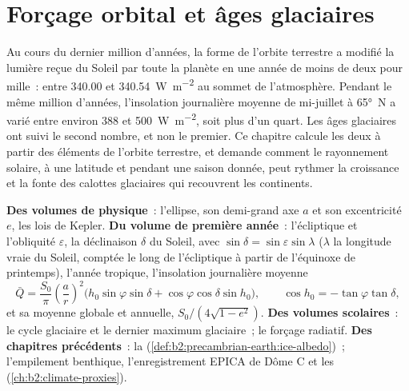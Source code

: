 \chapter{Forçage orbital et âges glaciaires}\label{ch:b2:orbital-forcing}

Au cours du dernier million d'années, la forme de l'orbite terrestre a modifié
la lumière reçue du Soleil par toute la planète en une année de moins de deux pour mille~:
entre \num{340.00} et \qty{340.54}{W.m^{-2}} au sommet de l'atmosphère. Pendant le même
million d'années, l'insolation journalière moyenne de mi-juillet à \ang{65}~N a varié entre
environ 388 et \qty{500}{W.m^{-2}}, soit plus d'un quart. Les âges glaciaires ont suivi le second
nombre, et non le premier. Ce chapitre calcule les deux à partir des éléments de l'orbite
terrestre, et demande comment le rayonnement solaire, à une latitude et pendant une saison donnée, peut rythmer la croissance et la fonte des calottes glaciaires qui recouvrent les continents.

\begin{recall}
\textbf{Des volumes de physique}~: l'ellipse, son demi-grand axe $a$ et son excentricité $e$, les lois
de Kepler. \textbf{Du volume de première année}~: l'écliptique et l'obliquité $\varepsilon$, la
déclinaison $\delta$ du Soleil, avec $\sin\delta = \sin\varepsilon\sin\lambda$ ($\lambda$ la longitude vraie du
Soleil, comptée le long de l'écliptique à partir de l'équinoxe de printemps), l'année tropique, l'insolation
journalière moyenne
\[
  \bar Q = \frac{S_0}{\pi}\left(\frac{a}{r}\right)^{2}\bigl(h_0\sin\varphi\sin\delta +
  \cos\varphi\cos\delta\sin h_0\bigr),\qquad \cos h_0 = -\tan\varphi\tan\delta ,
\]
et sa moyenne globale et annuelle, $S_0/(4\sqrt{1 - e^2})$. \textbf{Des volumes scolaires}~: le
cycle glaciaire et le dernier maximum glaciaire~; le forçage radiatif. \textbf{Des chapitres précédents}~: la
 (\cref{def:b2:precambrian-earth:ice-albedo})~; l'empilement benthique, l'enregistrement EPICA
de Dôme C et les  (\cref{ch:b2:climate-proxies}).
\end{recall}

